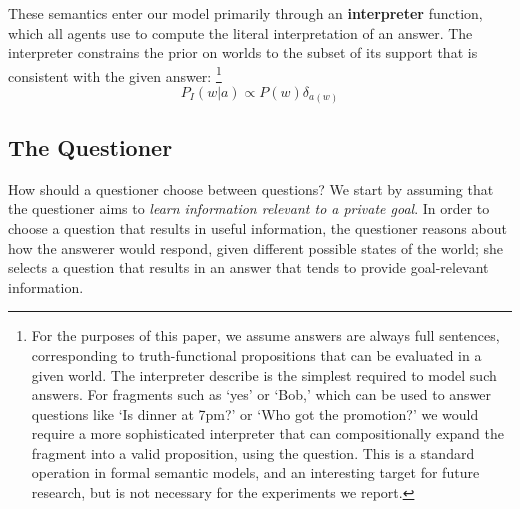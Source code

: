 \documentclass[12pt, floatsintext, jou]{apa6}
\begin{document}
These semantics enter our model primarily through an \textbf{interpreter} function, which all agents use to compute the literal interpretation of an answer. The interpreter constrains the prior on worlds to the subset of its support that is consistent with the given answer:%
\footnote{For the purposes of this paper, we assume answers are always full sentences, corresponding to truth-functional propositions that can be evaluated in a given world. The interpreter describe is the simplest required to model such answers. For fragments such as `yes' or `Bob,' which can be used to answer questions like `Is dinner at 7pm?' or `Who got the promotion?' we would require a more sophisticated interpreter that can compositionally expand the fragment into a valid proposition, using the question. This is a standard operation in formal semantic models, and an interesting target for future research, but is not necessary for the experiments we report.}
%
$$P_I(w | a) \propto P(w) \delta_{a(w)}$$
%

\subsection{The Questioner}

How should a questioner choose between questions?
%
We start by assuming that the questioner aims to \emph{learn information relevant to a private goal}.
%
In order to choose a question that results in useful information, the questioner reasons about how the answerer would respond, given different possible states of the world; she selects a question that results in an answer that tends to provide goal-relevant information.
%




\newcommand{\KL}[2]{\ensuremath{D_{KL}({#1}\, \| \, {#2})}}
\newcommand{\E}[2]{\ensuremath{\mathbb{E}_{#1}\left [#2 \right]}}
\end{document}
